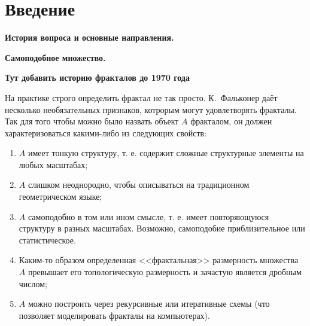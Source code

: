 \chapter*{Введение}                         %



\begin{center}
\textbf{История вопроса и основные направления.}
\end{center}
{\bf Самоподобное множество.}

{\bf Тут добавить историю фракталов до 1970 года}


На практике строго определить фрактал не так просто.
К.~Фальконер \cite{Falconer2004} даёт несколько необязательных признаков, котрорым могут удовлетворять фракталы.
Так для того чтобы можно было назвать объект $A$ фракталом, он должен характеризоваться какими-либо из следующих свойств:

\begin{enumerate}
\item $A$ имеет тонкую структуру, т. е. содержит сложные структурные элементы на любых масштабах;
\item $A$ слишком неоднородно, чтобы описываться на традиционном геометрическом языке;
\item $A$ самоподобно в том или ином смысле, т. е. имеет повторяющуюся структуру в разных масштабах. Возможно, самоподобие приблизительное или статистическое.
\item Каким-то образом определенная <<фрактальная>> размерность множества $A$ превышает его топологическую размерность и зачастую является дробным числом;
\item $A$ можно построить через рекурсивные или итеративные схемы (что позволяет моделировать фракталы на компьютерах).
\end{enumerate}


